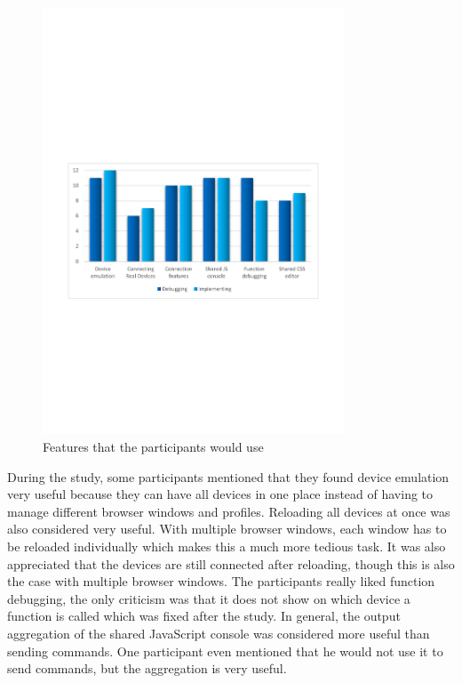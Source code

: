 \begin{figure}[H]
  \centering
    \includegraphics[width=0.8\textwidth]{images/charts/would_use_features.pdf}
	\caption[Features that participants would use]{Features that the participants would use}
	\label{fig:would_use_features}
\end{figure}

During the study, some participants mentioned that they found device emulation very useful because they can have all devices in one place instead of having to manage different browser windows and profiles. Reloading all devices at once was also considered very useful. With multiple browser windows, each window has to be reloaded individually which makes this a much more tedious task. It was also appreciated that the devices are still connected after reloading, though this is also the case with multiple browser windows. The participants really liked function debugging, the only criticism was that it does not show on which device a function is called which was fixed after the study. In general, the output aggregation of the shared JavaScript console was considered more useful than sending commands. One participant even mentioned that he would not use it to send commands, but the aggregation is very useful. 

